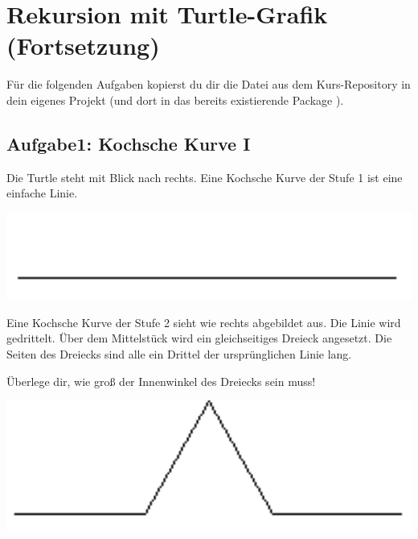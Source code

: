 \section{Rekursion mit Turtle-Grafik (Fortsetzung)}

Für die folgenden Aufgaben kopierst du dir die Datei
 aus dem Kurs-Repository in dein eigenes Projekt (und
dort in das bereits existierende Package ).

\subsection{Aufgabe1: Kochsche Kurve I}

\begin{minipage}{0.55\textwidth}
Die Turtle steht mit Blick nach rechts. Eine  Kochsche Kurve der Stufe 1 ist
eine einfache Linie.
\end{minipage}\hfill
\begin{minipage}{0.4\textwidth}
  \centering
  \includegraphics[width=1.0\textwidth]{./inf/SEKII/06_Java_Rekursion/Aufgabe3_1-1.png}
\end{minipage}

\begin{minipage}{0.55\textwidth}
Eine Kochsche Kurve der Stufe 2 sieht wie rechts abgebildet aus. Die Linie wird
gedrittelt. Über dem Mittelstück wird ein gleichseitiges Dreieck angesetzt. Die
Seiten des Dreiecks sind alle ein Drittel der ursprünglichen Linie lang.

Überlege dir, wie groß der Innenwinkel des Dreiecks sein muss!
\end{minipage}\hfill
\begin{minipage}{0.4\textwidth}
  \centering
  \includegraphics[width=1.0\textwidth]{./inf/SEKII/06_Java_Rekursion/Aufgabe3_1-2.png}
\end{minipage}

